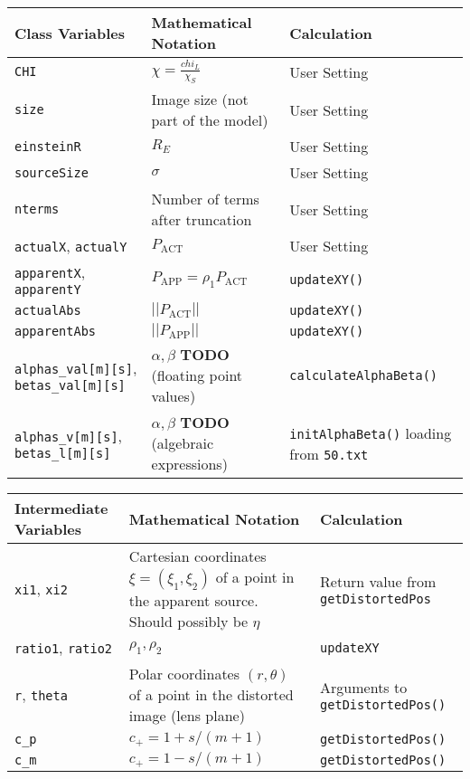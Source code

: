 \documentclass{scrartcl}
\begin{document}
\begin{center}
   \begin{tabular}{p{3cm}|p{6.5cm}|p{4cm}}
\hline
  Class Variables & Mathematical Notation & Calculation \\
\hline
\hline
   \texttt{CHI}       & $\chi=\frac{chi_L}{\chi_S}$      & User Setting \\
\hline
   \texttt{size}      & Image size (not part of the model) & User Setting \\
\hline
   \texttt{einsteinR} & $R_E$                              & User Setting \\
\hline
   \texttt{sourceSize} & $\sigma$                          & User Setting \\
\hline
   \texttt{nterms}    & Number of terms after truncation    & User Setting \\
\hline
   \texttt{actualX}, \texttt{actualY} & $P_{\textrm{ACT}}$  & User Setting\\
\hline
   \texttt{apparentX}, \texttt{apparentY} 
         & $P_{\textrm{APP}}=\rho_1P_{\textrm{ACT}}$ & \texttt{updateXY()} \\
\hline
   \texttt{actualAbs} & $||P_{\textrm{ACT}}||$ & \texttt{updateXY()} \\
\hline
   \texttt{apparentAbs} & $||P_{\textrm{APP}}||$ & \texttt{updateXY()} \\
\hline
   \texttt{alphas\_val[m][s]},
   \texttt{betas\_val[m][s]}  & $\alpha,\beta$ \textbf{TODO}
        (floating point values)
        & \texttt{calculateAlphaBeta()} \\
\hline
   \texttt{alphas\_v[m][s]},
   \texttt{betas\_l[m][s]}  & $\alpha,\beta$ \textbf{TODO}
        (algebraic expressions)
        & \texttt{initAlphaBeta()} loading from \texttt{50.txt} \\
\hline
\end{tabular}
\end{center}

\begin{center}
   \begin{tabular}{p{2cm}|p{7cm}|p{4.5cm}}
\hline
   Intermediate Variables & Mathematical Notation & Calculation \\
\hline
\hline
   \texttt{xi1}, \texttt{xi2}       & Cartesian coordinates $\xi=(\xi_1,\xi_2)$ of a point in the apparent source.  Should possibly be $\eta$     & Return value from \texttt{getDistortedPos} \\
\hline
   \texttt{ratio1}, \texttt{ratio2} & $\rho_1,\rho_2$   & \texttt{updateXY}        \\
\hline
   \texttt{r}, \texttt{theta} & Polar coordinates $(r,\theta)$ of a point in the distorted image (lens plane) &
      Arguments to \texttt{getDistortedPos()} \\
\hline
      \texttt{c\_p} & $c_+=1+s/(m+1)$ & \texttt{getDistortedPos()} \\
\hline
      \texttt{c\_m} & $c_+=1-s/(m+1)$ & \texttt{getDistortedPos()} \\
\hline
\hline
\end{tabular}
\end{center}
\end{document}
